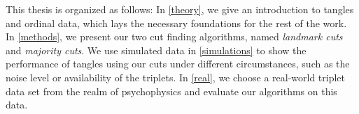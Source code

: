 This thesis is organized as follows: In \autoref{theory}, we give an introduction to tangles and ordinal data, which lays the necessary foundations for the rest of the work. 
In \autoref{methods}, we present our two cut finding algorithms, named \textit{landmark cuts} and \textit{majority cuts}.
We use simulated data in \autoref{simulations} to show the performance of tangles using our cuts under different circumstances, such as the noise level or availability of the triplets. 
In \autoref{real}, we choose a real-world triplet data set from the realm of psychophysics and evaluate our algorithms on this data.
